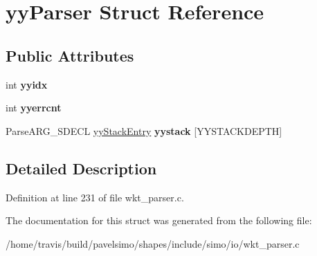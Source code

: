 \hypertarget{structyy_parser}{\section{yy\-Parser Struct Reference}
\label{structyy_parser}
}
\subsection*{Public Attributes}
\begin{DoxyCompactItemize}
\item 
\hypertarget{structyy_parser_a19abcf4780515fd2debd1ce7a2e29f95}{int {\bfseries yyidx}}\label{structyy_parser_a19abcf4780515fd2debd1ce7a2e29f95}

\item 
\hypertarget{structyy_parser_ac0350933aa515a3a756dfa742d04ee59}{int {\bfseries yyerrcnt}}\label{structyy_parser_ac0350933aa515a3a756dfa742d04ee59}

\item 
\hypertarget{structyy_parser_a269e4ebdc22c0b9102a8e29eebbdc201}{Parse\-A\-R\-G\-\_\-\-S\-D\-E\-C\-L \hyperlink{structyy_stack_entry}{yy\-Stack\-Entry} {\bfseries yystack} \mbox{[}Y\-Y\-S\-T\-A\-C\-K\-D\-E\-P\-T\-H\mbox{]}}\label{structyy_parser_a269e4ebdc22c0b9102a8e29eebbdc201}

\end{DoxyCompactItemize}


\subsection{Detailed Description}


Definition at line 231 of file wkt\-\_\-parser.\-c.



The documentation for this struct was generated from the following file\-:\begin{DoxyCompactItemize}
\item 
/home/travis/build/pavelsimo/shapes/include/simo/io/wkt\-\_\-parser.\-c\end{DoxyCompactItemize}
